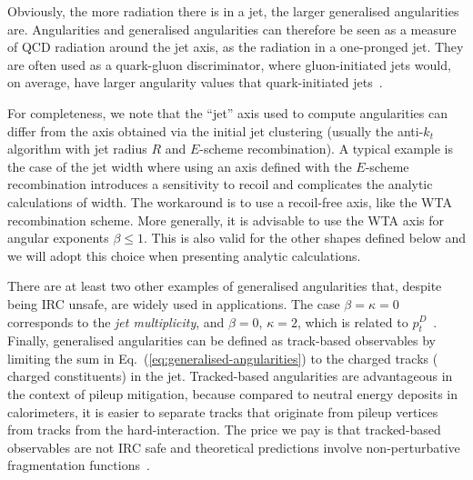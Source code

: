Obviously, the more radiation there is in a jet, the larger generalised
angularities are. 
%
Angularities and generalised angularities can therefore be seen as a
measure of QCD radiation around the jet axis, \ie as the radiation
in a one-pronged jet. They are often used as a quark-gluon
discriminator, where gluon-initiated jets would, on average, have
larger angularity values that quark-initiated
jets~\cite{Gallicchio:2011xq,Gallicchio:2012ez,Badger:2016bpw}.


For completeness, we note that the ``jet'' axis used to compute
angularities can differ from the axis obtained via the initial
jet clustering (usually the anti-$k_t$ algorithm with jet radius $R$
and $E$-scheme recombination). A typical example is the case of the jet
width where using an axis defined with the $E$-scheme recombination
introduces a sensitivity to recoil and complicates the analytic
calculations of width. The workaround is to use a recoil-free axis,
like the WTA recombination scheme. More generally, it is advisable to use the
WTA axis for angular exponents $\beta\le 1$. This is also valid for
the other shapes defined below and we will adopt this choice when presenting
analytic calculations.

There are at least two other examples of generalised angularities
that, despite being IRC unsafe, are widely used in applications. The
case $\beta=\kappa=0$ corresponds to the {\em jet multiplicity}, and
$\beta=0$, $\kappa=2$, which is related to
$p_t^D$~\cite{Pandolfi:1480598,Chatrchyan:2012sn}.
%
Finally, generalised angularities can be defined as track-based
observables by limiting the sum in
Eq.~(\ref{eq:generalised-angularities}) to the charged tracks (\ie
charged constituents) in the jet. Tracked-based angularities are
advantageous in the context of pileup mitigation, because compared to
neutral energy deposits in calorimeters, it is easier to separate
tracks that originate from pileup vertices from tracks from the
hard-interaction. The price we pay is that tracked-based observables
are not IRC safe and theoretical predictions involve non-perturbative
fragmentation
functions~\cite{Chang:2013rca,Chang:2013iba,Elder:2018mcr}.

